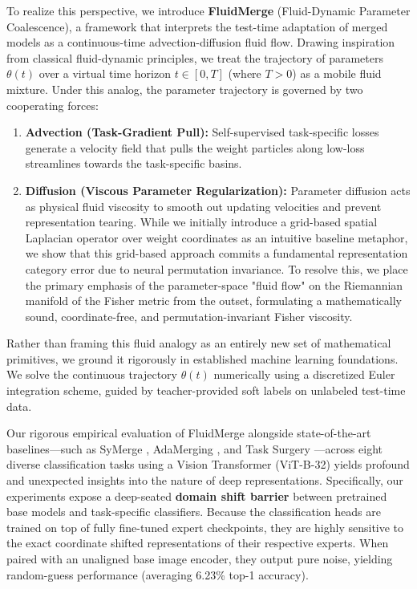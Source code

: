 To realize this perspective, we introduce \textbf{FluidMerge} (Fluid-Dynamic Parameter Coalescence), a framework that interprets the test-time adaptation of merged models as a continuous-time advection-diffusion fluid flow. Drawing inspiration from classical fluid-dynamic principles, we treat the trajectory of parameters $\theta(t)$ over a virtual time horizon $t \in [0, T]$ (where $T > 0$) as a mobile fluid mixture. Under this analog, the parameter trajectory is governed by two cooperating forces:
\begin{enumerate}
    \item \textbf{Advection (Task-Gradient Pull):} Self-supervised task-specific losses generate a velocity field that pulls the weight particles along low-loss streamlines towards the task-specific basins.
    \item \textbf{Diffusion (Viscous Parameter Regularization):} Parameter diffusion acts as physical fluid viscosity to smooth out updating velocities and prevent representation tearing. While we initially introduce a grid-based spatial Laplacian operator over weight coordinates as an intuitive baseline metaphor, we show that this grid-based approach commits a fundamental representation category error due to neural permutation invariance. To resolve this, we place the primary emphasis of the parameter-space "fluid flow" on the Riemannian manifold of the Fisher metric from the outset, formulating a mathematically sound, coordinate-free, and permutation-invariant Fisher viscosity.
\end{enumerate}

Rather than framing this fluid analogy as an entirely new set of mathematical primitives, we ground it rigorously in established machine learning foundations. We solve the continuous trajectory $\theta(t)$ numerically using a discretized Euler integration scheme, guided by teacher-provided soft labels on unlabeled test-time data.

Our rigorous empirical evaluation of FluidMerge alongside state-of-the-art baselines—such as SyMerge \cite{jung2025symerge}, AdaMerging \cite{yang2024adamerging}, and Task Surgery \cite{zhang2024task}—across eight diverse classification tasks using a Vision Transformer (ViT-B-32) \cite{radford2021clip, dosovitskiy2020image} yields profound and unexpected insights into the nature of deep representations. Specifically, our experiments expose a deep-seated \textbf{domain shift barrier} between pretrained base models and task-specific classifiers. Because the classification heads are trained on top of fully fine-tuned expert checkpoints, they are highly sensitive to the exact coordinate shifted representations of their respective experts. When paired with an unaligned base image encoder, they output pure noise, yielding random-guess performance (averaging 6.23\% top-1 accuracy). 

